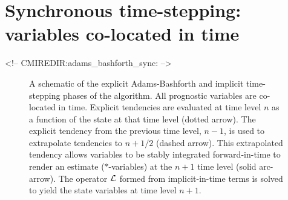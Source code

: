 \section{Synchronous time-stepping: variables co-located in time}
\label{sec:adams-bashforth-sync}
\begin{rawhtml}
<!-- CMIREDIR:adams_bashforth_sync: -->
\end{rawhtml}

\begin{figure}
\begin{center}
\end{center}
\caption{
A schematic of the explicit Adams-Bashforth and implicit time-stepping
phases of the algorithm. All prognostic variables are co-located in
time. Explicit tendencies are evaluated at time level $n$ as a
function of the state at that time level (dotted arrow). The explicit
tendency from the previous time level, $n-1$, is used to extrapolate
tendencies to $n+1/2$ (dashed arrow). This extrapolated tendency
allows variables to be stably integrated forward-in-time to render an
estimate ($*$-variables) at the $n+1$ time level (solid
arc-arrow). The operator ${\cal L}$ formed from implicit-in-time terms
is solved to yield the state variables at time level $n+1$. }
\label{fig:adams-bashforth-sync}
\end{figure}

